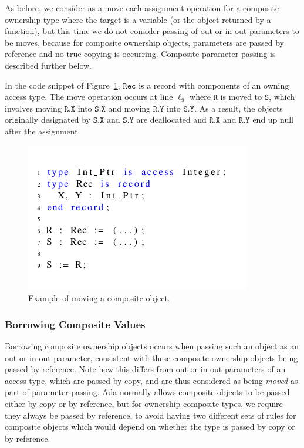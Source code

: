 \documentclass{llncs}
\newcommand\var[1]{\ensuremath{\mathtt{#1}}}
\newcommand{\keyword}[1]{\textsf{#1}}
\begin{document}
As before, we consider as a move each assignment operation for a composite ownership type where the target is a variable (or the object returned by a function), but this time we do not
consider passing of \keyword{out} or \keyword{in out} parameters to be moves, because for composite ownership objects, parameters are passed by reference and no true copying is occurring. Composite parameter passing is described further below.

In the code snippet of Figure~\ref{fig:movingComposite}, \var{Rec} is a record with components of an owning access type. The move operation occurs at line $\ell_{9}$ where \var{R} is moved
to \var{S}, which involves moving \var{R.X} into \var{S.X} and moving \var{R.Y} into \var{S.Y}. As a result, the objects originally designated by
\var{S.X} and \var{S.Y} are deallocated and \var{R.X} and \var{R.Y} end up null after the assignment. 


\begin{figure}[htb!]
\centering
   \includegraphics[]{movingComposite}
   \caption{Example of moving a composite object.}
   \label{fig:movingComposite}
\end{figure}
 
\subsubsection{Borrowing Composite Values}
\label{subsubsec:borrowComposite}

Borrowing composite ownership objects occurs when passing such an object as an \keyword{out} or \keyword{in out} parameter, consistent with
these composite ownership objects being passed by reference. Note how this differs from \keyword{out} or \keyword{in out} parameters of an access type, which are passed by copy,
and are thus considered as being \textit{moved} as part of parameter passing. Ada normally allows composite objects to be passed either by copy or by reference, but for ownership composite types, we require they always be passed by reference, to avoid having two different sets of rules for composite objects which would depend on whether the type is passed by copy or by reference.
\end{document}
